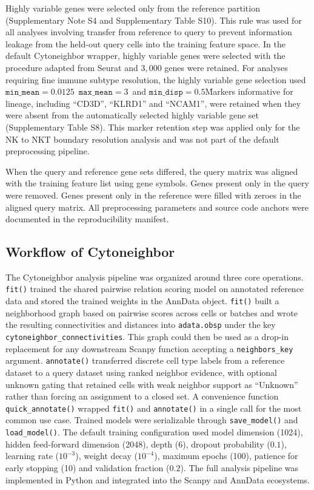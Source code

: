 \documentclass[11pt]{article}
\begin{document}
Highly variable genes were selected only from the reference partition (Supplementary Note S4 and Supplementary Table S10). This rule was used for all analyses involving transfer from reference to query to prevent information leakage from the held-out query cells into the training feature space. In the default Cytoneighbor wrapper, highly variable genes were selected with the procedure adapted from Seurat and $3,000$ genes were retained. For analyses requiring fine immune subtype resolution, the highly variable gene selection used $\texttt{min\_mean} = 0.0125$\, $\texttt{max\_mean} = 3$\ and $\texttt{min\_disp} = 0.5$\. Markers informative for lineage, including ``CD3D'', ``KLRD1'' and ``NCAM1'', were retained when they were absent from the automatically selected highly variable gene set (Supplementary Table S8). This marker retention step was applied only for the NK to NKT boundary resolution analysis and was not part of the default preprocessing pipeline.

When the query and reference gene sets differed, the query matrix was aligned with the training feature list using gene symbols. Genes present only in the query were removed. Genes present only in the reference were filled with zeroes in the aligned query matrix. All preprocessing parameters and source code anchors were documented in the reproducibility manifest.

\subsection*{Workflow of Cytoneighbor}

The Cytoneighbor analysis pipeline was organized around three core operations. \texttt{fit()} trained the shared pairwise relation scoring model on annotated reference data and stored the trained weights in the AnnData object. \texttt{fit()} built a neighborhood graph based on pairwise scores across cells or batches and wrote the resulting connectivities and distances into \texttt{adata.obsp} under the key \texttt{cytoneighbor\_connectivities}. This graph could then be used as a drop-in replacement for any downstream Scanpy function accepting a \texttt{neighbors\_key} argument. \texttt{annotate()} transferred discrete cell type labels from a reference dataset to a query dataset using ranked neighbor evidence, with optional unknown gating that retained cells with weak neighbor support as ``Unknown'' rather than forcing an assignment to a closed set. A convenience function \texttt{quick\_annotate()} wrapped \texttt{fit()} and \texttt{annotate()} in a single call for the most common use case. Trained models were serializable through \texttt{save\_model()} and \texttt{load\_model()}. The default training configuration used model dimension (1024), hidden feed-forward dimension (2048), depth (6), dropout probability ($0.1$), learning rate ($10^{-3}$), weight decay ($10^{-4}$), maximum epochs (100), patience for early stopping (10) and validation fraction ($0.2$). The full analysis pipeline was implemented in Python and integrated into the Scanpy and AnnData ecosystems.
\end{document}
